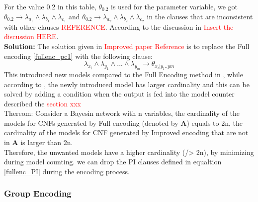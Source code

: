 \begin{itemize}
        For the value 0.2 in this table, $\theta_{0.2}$ is used for the parameter variable, we got $ \theta_{0.2} \rightarrow \lambda_{a_{1}} \wedge \lambda_{b_{1}} \wedge \lambda_{c_{1}}$ and $ \theta_{0.2} \rightarrow \lambda_{a_{2}} \wedge \lambda_{b_{2}} \wedge \lambda_{c_{2}}$ in the clauses that are inconsistent with other clauses \textcolor{red}{REFERENCE}. According to the discussion in \textcolor{red}{Insert the discussion HERE}.\\
        \textbf{Solution:} The solution given in \textcolor{red}{Improved paper Reference} is to replace the Full encoding \ref{fullenc_pc1} with the following clause:
        \begin{equation}\label{improvedenc_pc}
            \lambda_{x_{i}} \wedge \lambda_{y_{1}} \wedge... \wedge \lambda_{y_{m}} \rightarrow \theta_{x_{i}|y_{1}..y{m}}
        \end{equation}
        This introduced new models compared to the Full Encoding method in \cite{enc1}, while according to \cite{enc2}, the newly introduced model has larger cardinality and this can be solved by adding a condition when the output is fed into the model counter described the \textcolor{red}{section xxx}\\
        \noindent Thereom: Consider a Bayesin network with n variables, the cardinality of the models for CNFs  generated by Full encoding (denoted by \textbf{A}) equals to 2n, the cardinality of the models for CNF generated by Improved encoding that are not in \textbf{A} is larger than 2n.\\
        Therefore, the unwanted models have a higher cardinality (/> 2n), by minimizing during model counting. we can drop the PI clauses defined in equaltion \ref{fullenc_PI} during the encoding process.
        \end{itemize}
        
        \subsubsection{Group Encoding}
        
